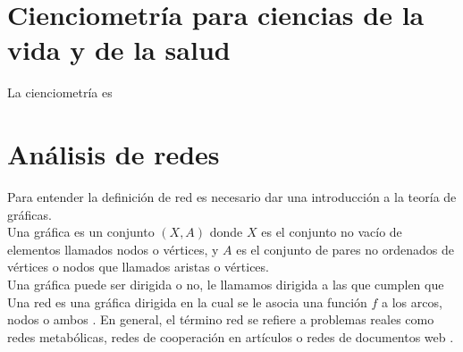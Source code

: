 \section{Cienciometría para ciencias de la vida y de la salud}
\noindent
La cienciometría es  

\section{Análisis de redes}
\noindent
Para entender la definición de red es necesario dar una introducción a la teoría de gráficas.\\
Una gráfica es un conjunto $(X,A)$ donde $X$ es el conjunto no vacío de elementos llamados nodos o vértices, y $A$ es el conjunto de pares no ordenados de vértices o nodos que llamados aristas o vértices.\\
Una gráfica puede ser dirigida o no, le llamamos dirigida a las que cumplen que  \\

Una red es una gráfica dirigida en la cual se le asocia una función $f$ a los arcos, nodos o ambos \parencite{hernandez_redes}. En general, el término red se refiere a problemas reales como redes metabólicas, redes de cooperación en artículos o redes de documentos web \parencite{barabasi_network_2016}.


